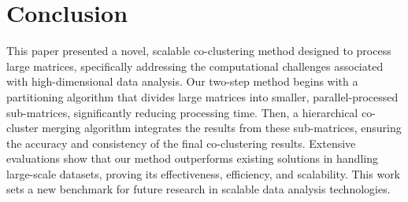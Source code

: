 
\section{Conclusion}
\label{sec:conclude}
This paper presented a novel, scalable co-clustering method designed to process large matrices, specifically addressing the computational challenges associated with high-dimensional data analysis. Our two-step method begins with a partitioning algorithm that divides large matrices into smaller, parallel-processed sub-matrices, significantly reducing processing time. Then, a hierarchical co-cluster merging algorithm integrates the results from these sub-matrices, ensuring the accuracy and consistency of the final co-clustering results. Extensive evaluations show that our method outperforms existing solutions in handling large-scale datasets, proving its effectiveness, efficiency, and scalability. This work sets a new benchmark for future research in scalable data analysis technologies.
